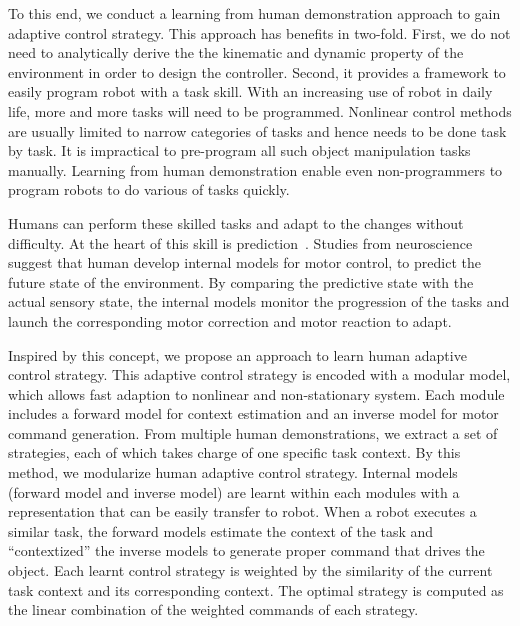 To this end, we conduct a learning from human demonstration approach to gain adaptive control strategy. This approach has benefits in two-fold. First, we do not need to analytically derive the the kinematic and dynamic property of the environment in order to design the controller. Second, it provides a framework to easily program robot with a task skill. With an increasing use of robot in daily life, more and more tasks will need to be programmed. Nonlinear control methods are usually limited to narrow categories of tasks and hence needs to be done task by task. It is impractical to pre-program all such object manipulation tasks manually. Learning from human demonstration enable even non-programmers to program robots to do various of tasks quickly.

Humans can perform these skilled tasks and adapt to the changes without difficulty. At the heart of this skill is prediction~\cite{flanagan2006control}. Studies from neuroscience suggest that human develop internal models for motor control, to predict the future state of the environment. By comparing the predictive state with the actual sensory state, the internal models monitor the progression of the tasks and launch the corresponding motor correction and motor reaction to adapt.


Inspired by this concept, we propose an approach to learn human adaptive control strategy. This adaptive control strategy is encoded with a modular model, which allows fast adaption to nonlinear and non-stationary system. Each module includes a forward model for context estimation and an inverse model for motor command generation. From multiple human demonstrations, we extract a set of strategies, each of which takes charge of one specific task context. By this method, we modularize human adaptive control strategy. Internal models (forward model and inverse model) are learnt within each modules with a representation that can be easily transfer to robot. When a robot executes a similar task, the forward models estimate the context of the task and ``contextized'' the inverse models to generate proper command that drives the object.
Each learnt control strategy is weighted by the similarity of the current task context and its corresponding context. The optimal strategy is computed as the linear combination of the weighted commands of each strategy.

